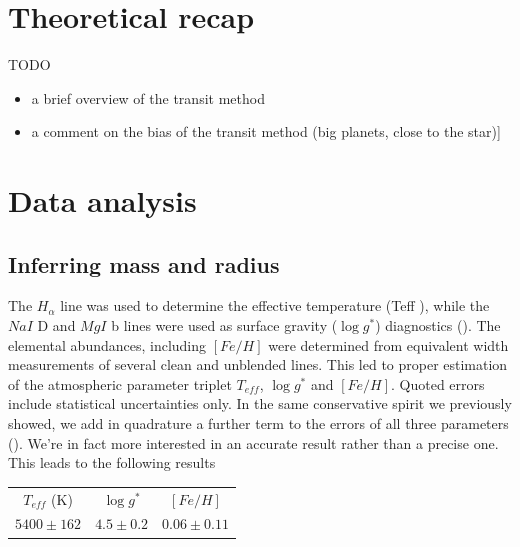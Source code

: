 \documentclass[a4paper,11pt,twocolumn]{article}
\begin{document}




\section{Theoretical recap}

TODO
\begin{itemize}
    \item a brief overview of the transit method
    \item a comment on the bias of the transit method (big planets, close to the star)]

\end{itemize}


\section{Data analysis}

\subsection{Inferring mass and radius}

The $H_{\alpha}$ line was used to determine the effective temperature (Teff ),
while the $NaI$ D and $MgI$ b lines were used as surface gravity
($\log{g^*}$) diagnostics (\cite{Anderson}). The elemental abundances, including $[Fe/H]$ 
were determined from equivalent width measurements of several clean and 
unblended lines. This led to proper estimation of the atmospheric parameter 
triplet $T_{eff}$, $\log{g^*}$ and $[Fe/H]$. Quoted errors include statistical 
uncertainties only. In the same conservative spirit we 
previously showed, we add in quadrature a further term to the errors of 
all three parameters (\cite{Sousa}). We're in fact more interested in an 
accurate result rather than a precise one.
This leads to the following results 
\begin{center}
    \begin{tabular}{|c|c|c|}
    \hline
    $T_{eff}$ (K) & $\log{g^*}$ & $[Fe/H]$ \\
    $5400 \pm 162$ & $4.5 \pm 0.2$ & $0.06 \pm 0.11$ \\
    \hline
    \end{tabular}
    \end{center}
\end{document}
